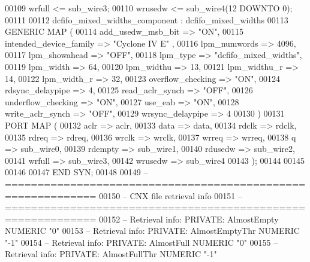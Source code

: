\begin{DoxyCode}
{00109     \textcolor{vhdlchar}{wrfull}    \textcolor{vhdlchar}{<=} \textcolor{vhdlchar}{sub_wire3};
00110     \textcolor{vhdlchar}{wrusedw}    \textcolor{vhdlchar}{<=} \textcolor{vhdlchar}{sub_wire4}\textcolor{vhdlchar}{(}\textcolor{vhdllogic}{}\textcolor{vhdllogic}{12} \textcolor{keywordflow}{DOWNTO} \textcolor{vhdllogic}{}\textcolor{vhdllogic}{0}\textcolor{vhdlchar}{)};
00111 
00112     dcfifo_mixed_widths_component : dcfifo\_mixed\_widths
00113     \textcolor{keywordflow}{GENERIC} \textcolor{keywordflow}{MAP} (
00114         add\_usedw\_msb\_bit => \textcolor{keyword}{"ON"},
00115         intended\_device\_family => \textcolor{keyword}{"Cyclone IV E"}  ,
00116         lpm\_numwords => \textcolor{vhdllogic}{4096},
00117         lpm\_showahead => \textcolor{keyword}{"OFF"},
00118         lpm\_type => \textcolor{keyword}{"dcfifo\_mixed\_widths"},
00119         lpm\_width => \textcolor{vhdllogic}{64},
00120         lpm\_widthu => \textcolor{vhdllogic}{13},
00121         lpm\_widthu\_r => \textcolor{vhdllogic}{14},
00122         lpm\_width\_r => \textcolor{vhdllogic}{32},
00123         overflow\_checking => \textcolor{keyword}{"ON"},
00124         rdsync\_delaypipe => \textcolor{vhdllogic}{4},
00125         read\_aclr\_synch => \textcolor{keyword}{"OFF"},
00126         underflow\_checking => \textcolor{keyword}{"ON"},
00127         use\_eab => \textcolor{keyword}{"ON"},
00128         write\_aclr\_synch => \textcolor{keyword}{"OFF"},
00129         wrsync\_delaypipe => \textcolor{vhdllogic}{4}
00130     \textcolor{vhdlchar}{)}
00131     \textcolor{keywordflow}{PORT} \textcolor{keywordflow}{MAP} (
00132         aclr => aclr,
00133         data => data,
00134         rdclk => rdclk,
00135         rdreq => rdreq,
00136         wrclk => wrclk,
00137         wrreq => wrreq,
00138         q => sub_wire0,
00139         rdempty => sub_wire1,
00140         rdusedw => sub_wire2,
00141         wrfull => sub_wire3,
00142         wrusedw => sub_wire4
00143     \textcolor{vhdlchar}{)};
00144 
00145 
00146 
00147 \textcolor{keywordflow}{END} \textcolor{vhdlchar}{SYN};
00148 
00149 \textcolor{keyword}{-- ============================================================}
00150 \textcolor{keyword}{-- CNX file retrieval info}
00151 \textcolor{keyword}{-- ============================================================}
00152 \textcolor{keyword}{-- Retrieval info: PRIVATE: AlmostEmpty NUMERIC "0"}
00153 \textcolor{keyword}{-- Retrieval info: PRIVATE: AlmostEmptyThr NUMERIC "-1"}
00154 \textcolor{keyword}{-- Retrieval info: PRIVATE: AlmostFull NUMERIC "0"}
00155 \textcolor{keyword}{-- Retrieval info: PRIVATE: AlmostFullThr NUMERIC "-1"}
}
\end{DoxyCode}

